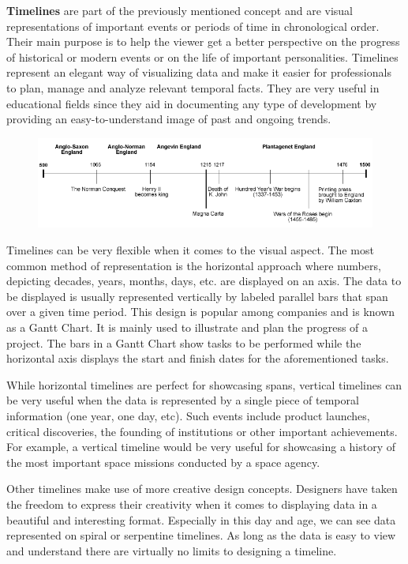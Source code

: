 \documentclass{report}
\begin{document}
\textbf{Timelines} are part of the previously mentioned concept and are visual representations of important events or periods of time in chronological order. Their main purpose is to help the viewer get a better perspective on the progress of historical or modern events or on the life of important personalities. Timelines represent an elegant way of visualizing data and make it easier for professionals to plan, manage and analyze relevant temporal facts. They are very useful in educational fields since they aid in documenting any type of development by providing an easy-to-understand image of past and ongoing trends.\par

\begin{figure}[b]
\centerline{\includegraphics[scale=1.8]{media_timeline}}
\end{figure}

Timelines can be very flexible when it comes to the visual aspect. The most common method of representation is the horizontal approach where numbers, depicting decades, years, months, days, etc. are displayed on an axis. The data to be displayed is usually represented vertically by labeled parallel bars that span over a given time period. This design is popular among companies and is known as a Gantt Chart. It is mainly used to illustrate and plan the progress of a project. The bars in a Gantt Chart show tasks to be performed while the horizontal axis displays the start and finish dates for the aforementioned tasks.\par

While horizontal timelines are perfect for showcasing spans, vertical timelines can be very useful when the data is represented by a single piece of temporal information (one year, one day, etc). Such events include product launches, critical discoveries, the founding of institutions or other important achievements. For example, a vertical timeline would be very useful for showcasing a history of the most important space missions conducted by a space agency.\par

Other timelines make use of more creative design concepts. Designers have taken the freedom to express their creativity when it comes to displaying data in a beautiful and interesting format. Especially in this day and age,  we can see data represented on spiral or serpentine timelines. As long as the data is easy to view and understand there are virtually no limits to designing a timeline.\par 
\end{document}
